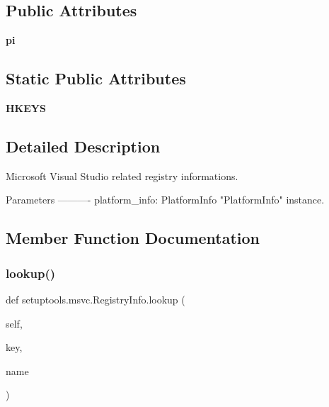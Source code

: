 \subsection*{Public Attributes}
\begin{DoxyCompactItemize}
\item 
\mbox{\label{classsetuptools_1_1msvc_1_1_registry_info_aa8ed2489936d70edee47f07fdc8820a7}} 
{\bfseries pi}
\end{DoxyCompactItemize}
\subsection*{Static Public Attributes}
\begin{DoxyCompactItemize}
\item 
\mbox{\label{classsetuptools_1_1msvc_1_1_registry_info_ae0ddb2af656e0c3892f77268563edbe1}} 
{\bfseries H\+K\+E\+YS}
\end{DoxyCompactItemize}


\subsection{Detailed Description}
\begin{DoxyVerb}Microsoft Visual Studio related registry informations.

Parameters
----------
platform_info: PlatformInfo
    "PlatformInfo" instance.
\end{DoxyVerb}
 

\subsection{Member Function Documentation}
\mbox{\label{classsetuptools_1_1msvc_1_1_registry_info_afc91b9bf7451e111733eebb84a3b27f6}} 
\subsubsection{\texorpdfstring{lookup()}{lookup()}}
{\footnotesize\ttfamily def setuptools.\+msvc.\+Registry\+Info.\+lookup (\begin{DoxyParamCaption}\item[{}]{self,  }\item[{}]{key,  }\item[{}]{name }\end{DoxyParamCaption})}

